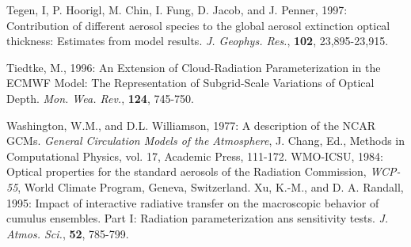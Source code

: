 \decrefname
Tegen, I, P. Hoorigl, M. Chin, I. Fung, D. Jacob, and J. Penner, 1997:
Contribution of different aerosol species to the global aerosol extinction
optical thickness: Estimates from model results. 
{\it J. Geophys. Res.},
{\bf 102},
23,895-23,915.

\decrefname
Tiedtke, M., 1996: An Extension of Cloud-Radiation Parameterization in the ECMWF Model: The Representation of Subgrid-Scale Variations of Optical Depth.
      {\it Mon. Wea. Rev.},
{\bf 124},
745-750.

\decrefname
Washington, W.M., and D.L. Williamson, 1977:
      A description of the NCAR GCMs.
      {\it General Circulation Models of the Atmosphere},
      J. Chang, Ed., Methods in Computational Physics, vol. 17, Academic Press,
      111-172.
\decrefname
WMO-ICSU, 1984:
      Optical properties for the standard aerosols of the Radiation Commission,
      {\it WCP-55},
      World Climate Program, Geneva, Switzerland.
\decrefname
Xu, K.-M., and D. A. Randall, 1995:
      Impact of interactive radiative transfer on the macroscopic behavior of
      cumulus ensembles. Part I: Radiation parameterization ans sensitivity
      tests.
      {\it J. Atmos. Sci.},
      {\bf 52},
      785-799.
